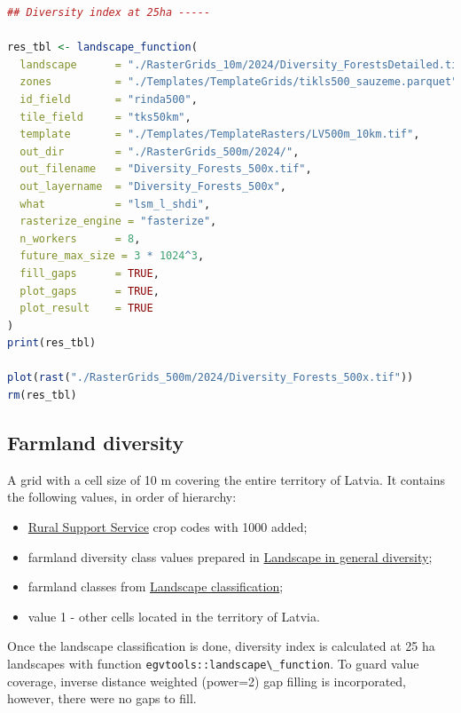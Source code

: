 \documentclass[
]{book}
\newcommand{\passthrough}[1]{#1}
\begin{document}
\begin{lstlisting}[language=R]
## Diversity index at 25ha -----

res_tbl <- landscape_function(
  landscape      = "./RasterGrids_10m/2024/Diversity_ForestsDetailed.tif",
  zones          = "./Templates/TemplateGrids/tikls500_sauzeme.parquet",
  id_field       = "rinda500",
  tile_field     = "tks50km",
  template       = "./Templates/TemplateRasters/LV500m_10km.tif",
  out_dir        = "./RasterGrids_500m/2024/",
  out_filename   = "Diversity_Forests_500x.tif",
  out_layername  = "Diversity_Forests_500x",
  what           = "lsm_l_shdi",
  rasterize_engine = "fasterize",
  n_workers      = 8,
  future_max_size = 3 * 1024^3,
  fill_gaps      = TRUE,
  plot_gaps      = TRUE,
  plot_result    = TRUE
)
print(res_tbl)

plot(rast("./RasterGrids_500m/2024/Diversity_Forests_500x.tif"))
rm(res_tbl)
\end{lstlisting}

\subsection{Farmland diversity}\label{Ch05.04.03}

A grid with a cell size of 10 m covering the entire territory of Latvia. It
contains the following values, in order of hierarchy:

\begin{itemize}
\item
  \hyperref[Ch04.02]{Rural Support Service} crop codes with 1000 added;
\item
  farmland diversity class values prepared in \hyperref[Ch05.04.01]{Landscape in general diversity};
\item
  farmland classes from \hyperref[Ch05.03]{Landscape classification};
\item
  value 1 - other cells located in the territory of Latvia.
\end{itemize}

Once the landscape classification is done, diversity index is calculated at 25 ha
landscapes with function \passthrough{\lstinline!egvtools::landscape\_function!}. To guard value coverage,
inverse distance weighted (power=2) gap filling is incorporated, however,
there were no gaps to fill.
\end{document}
